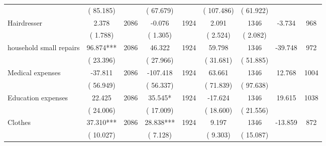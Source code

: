 \begin{tabular}{l*{8}{c}}
                       &       (      85.185)            &                               &       (      67.679)            &                               &       (     107.486)            &       (      61.922) &                  \\
Hairdresser        &              2.378      &       2086       &             -0.076      &       1924       &              2.091      &       1346  &       -3.734 &       968       \\
                       &       (       1.788)            &                               &       (       1.305)            &                               &       (       2.524)            &       (       2.082) &                  \\
household small repairs        &             96.874***      &       2086       &             46.322      &       1924       &             59.798      &       1346  &      -39.748 &       972       \\
                       &       (      23.396)            &                               &       (      27.966)            &                               &       (      31.681)            &       (      51.885) &                  \\
Medical expenses        &            -37.811      &       2086       &           -107.418      &       1924       &             63.661      &       1346  &       12.768 &       1004       \\
                       &       (      56.949)            &                               &       (      56.337)            &                               &       (      71.839)            &       (      97.638) &                  \\
Education expenses        &             22.425      &       2086       &             35.545*      &       1924       &            -17.624      &       1346  &       19.615 &       1038       \\
                       &       (      24.006)            &                               &       (      17.009)            &                               &       (      18.600)            &       (      21.556) &                  \\
Clothes        &             37.310***      &       2086       &             28.838***      &       1924       &              9.197      &       1346  &      -13.859 &       872       \\
                       &       (      10.027)            &                               &       (       7.128)            &                               &       (       9.303)            &       (      15.087) &                  \\

\end{tabular}
